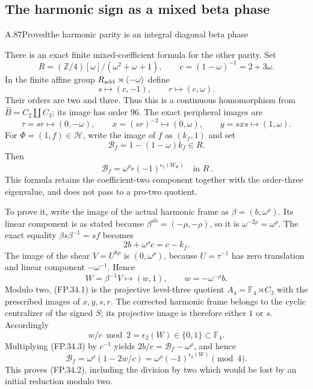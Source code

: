 \subsection{The harmonic sign as a mixed beta phase}


\begin{statement}{A.87}{Proved}{the harmonic parity is an integral diagonal beta phase}
\citep[Proposition 4.4]{LitNakamuraTsunogaiYasuda2010}
\end{statement}
There is an exact finite mixed-coefficient formula for the other
parity. Set
\[
 R=(\mathbb Z/4)[\omega]/(\omega^2+\omega+1),\qquad
 c=(1-\omega)^{-1}=2+3\omega.
\]
In the finite affine group $R_{\rm add}\rtimes\langle-\omega\rangle$
define
\[
 s\longmapsto(c,-1),\qquad r\longmapsto(c,\omega).
 \tag{FP.34.1}
\]
Their orders are two and three. Thus this is a continuous
homomorphism from $\widehat B=C_2\amalg C_3$; its image has order
$96$. The exact peripheral images are
\[
 \tau=sr\longmapsto(0,-\omega),\qquad
 x=(sr)^{-2}\longmapsto(0,\omega),\qquad
 y=sxs\longmapsto(1,\omega).
\]
For $\Phi=(1,f)\in\mathcal H$, write the image of $f$ as
$(k_f,1)$ and set
\[
 \mathcal B_f=1-(1-\omega)k_f\in R.
\]
Then
\[
 \boxed{\ \mathcal B_f
       =\omega^{\rho_\Phi}(-1)^{\epsilon_2(W_\Phi)}\quad\text{in }R\ }.
 \tag{FP.34.2}
\]
This formula retains the coefficient-two component together with
the order-three eigenvalue, and does not pass to a pro-two quotient.

To prove it, write the image of the actual harmonic frame as
$\beta=(b,\omega^\rho)$. Its linear component is as stated because
$\beta^{\mathrm{ab}}=(-\rho,-\rho)$, so it is
$\omega^{-2\rho}=\omega^\rho$. The exact equality
$\beta s\beta^{-1}=sf$ becomes
\[
 2b+\omega^\rho c=c-k_f.
 \tag{FP.34.3}
\]
The image of the shear $V=U^{8\rho}$ is $(0,\omega^\rho)$,
because $U=\tau^{-1}$ has zero translation and linear component
$-\omega^{-1}$. Hence
\[
 W=\beta^{-1}V\longmapsto(w,1),\qquad
 w=-\omega^{-\rho}b.
\]
Modulo two, (FP.34.1) is the projective level-three quotient
$A_4=\mathbb F_4\rtimes C_3$ with the prescribed images of
$x,y,s,r$. The corrected harmonic frame belongs to the cyclic
centralizer of the signed $S$; its projective image is therefore
either $1$ or $s$. Accordingly
\[
 w/c\bmod2=\epsilon_2(W)\in\{0,1\}\subset\mathbb F_4.
\]
Multiplying (FP.34.3) by $c^{-1}$ yields
$2b/c=\mathcal B_f-\omega^\rho$, and hence
\[
 \mathcal B_f=\omega^\rho(1-2w/c)
             =\omega^\rho(-1)^{\epsilon_2(W)}\pmod4.
\]
This proves (FP.34.2), including the division by two which would
be lost by an initial reduction modulo two.

